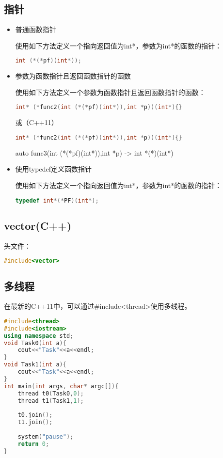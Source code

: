 \documentclass[UTF8]{ctexart}
\begin{document}
\subsection{指针}
\begin{itemize}
\item {\LARGE 普通函数指针}

使用如下方法定义一个指向返回值为int*，参数为int*的函数的指针：
\begin{lstlisting}[language=C++]
int (*(*pf)(int*));
\end{lstlisting}
\item {\LARGE 参数为函数指针且返回函数指针的函数}

使用如下方法定义一个参数为函数指针且返回函数指针的函数：
\begin{lstlisting}[language=C++]
int* (*func2(int (*(*pf)(int*)),int *p))(int*){}
\end{lstlisting}

或（C++11）

\begin{lstlisting}[language=C++]
int* (*func2(int (*(*pf)(int*)),int *p))(int*){}
\end{lstlisting}
auto func3(int (*(*pf)(int*)),int *p) -> int *(*)(int*){}
\item {\LARGE 使用typedef定义函数指针}

使用如下方法定义一个指向返回值为int*，参数为int*的函数的指针：
\begin{lstlisting}[language=C++]
typedef int*(*PF)(int*);
\end{lstlisting}
\end{itemize}
\subsection{vector(C++)}
头文件：
\begin{lstlisting}[language=C++]
#include<vector>
\end{lstlisting}
\subsection{多线程}
在最新的C++11中，可以通过\#include<thread>使用多线程。
\begin{lstlisting}[language=C++]
#include<thread>
#include<iostream>
using namespace std;
void Task0(int a){
    cout<<"Task"<<a<<endl;
}
void Task1(int a){
    cout<<"Task"<<a<<endl;
}
int main(int args, char* argc[]){
    thread t0(Task0,0);
    thread t1(Task1,1);
    
    t0.join();
    t1.join();
    
    system("pause");
    return 0;
}
\end{lstlisting}
\end{document}
